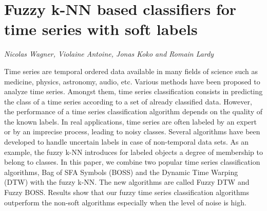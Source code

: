 \documentclass[../booklet.tex]{subfiles}
\begin{document}
\section[Fuzzy k-NN based classifiers for time series with soft labels. {\it Nicolas Wagner, Violaine Antoine, Jonas Koko and Romain Lardy}]{Fuzzy k-NN based classifiers for time series with soft labels}
   

\begin{center}
  {\it Nicolas Wagner, Violaine Antoine, Jonas Koko and Romain Lardy}
\end{center}

\vskip 0.8cm


Time series are temporal ordered data available in many fields of science such as medicine, physics, astronomy, audio, etc. Various methods have been proposed to analyze time series. Amongst them, time series classification consists in predicting the class of a time series according to a set of already classified data. However, the performance of a time series classification algorithm depends on the quality of the known labels.  In real applications, time series are often labeled by an expert or by an imprecise process, leading to noisy classes. Several algorithms have been developed to handle uncertain labels in case of non-temporal data sets. As an example, the fuzzy k-NN introduces for labeled objects a degree of membership to belong to classes. In this paper, we combine two popular time series classification algorithms, Bag of SFA Symbols (BOSS) and the Dynamic Time Warping (DTW) with the fuzzy k-NN. The new algorithms are called Fuzzy DTW and Fuzzy BOSS. Results show that our fuzzy time series classification algorithms outperform the non-soft algorithms especially when the level of noise is high.
\end{document}
